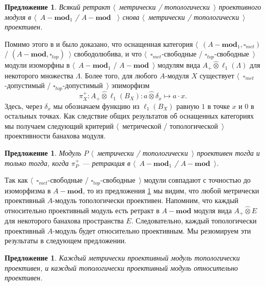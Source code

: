 \documentclass[12pt]{article}
\newcommand{\projtens}{\mathbin{\widehat{\otimes}}}
\newtheorem{proposition}[theorem]{Предложение}
\begin{document}
\begin{proposition}\label{RetrMetTopProjIsMetTopProj} Всякий ретракт $\langle$~метрически / топологически~$\rangle$ проективного модуля в $\langle$~$A-\mathbf{mod}_1$ / $A-\mathbf{mod}$ ~$\rangle$ снова $\langle$~метрически / топологически~$\rangle$ проективен.
\end{proposition}

Помимо этого в \cite{HelMetrFrQMod} и \cite{ShtTopFrClassicQuantMod} было доказано, что оснащенная категория $\langle$~$(A-\mathbf{mod}_1,\square_{met})$ / $(A-\mathbf{mod},\square_{top})$~$\rangle$ свободолюбива, и что $\langle$~$\square_{met}$-свободные / $\square_{top}$-свободные~$\rangle$ модули изоморфны в $\langle$~$A-\mathbf{mod}_1$ / $A-\mathbf{mod}$~$\rangle$ модулям вида $A_+\projtens \ell_1(\Lambda)$ для некоторого множества $\Lambda$. Более того, для любого $A$-модуля $X$ существует $\langle$~$\square_{met}$-допустимый / $\square_{top}$-допустимый~$\rangle$ эпиморфизм
$$
\pi_X^+:A_+\projtens \ell_1(B_X):a\projtens \delta_x\mapsto a\cdot x.
$$
Здесь, через $\delta_x$ мы обозначаем функцию из $\ell_1(B_X)$ равную $1$ в точке $x$ и $0$ в остальных точках. Как следствие общих результатов об оснащенных категориях мы получаем следующий критерий  $\langle$~метрической / топологической~$\rangle$ проективности банахова модуля.

\begin{proposition}\label{MetTopProjModViaCanonicMorph}
Модуль $P$ $\langle$~метрически / топологически~$\rangle$ проективен тогда и только тогда, когда  $\pi_P^+$ --- ретракция в $\langle$~$A-\mathbf{mod}_1$ / $A-\mathbf{mod}$~$\rangle$.
\end{proposition}

Так как $\langle$~$\square_{met}$-свободные / $\square_{top}$-свободные~$\rangle$ модули совпадают с точностью до изоморфизма в $A-\mathbf{mod}$, то из предложения \ref{RetrMetTopProjIsMetTopProj} мы видим, что любой метрически проективный $A$-модуль топологически проективен. Напомним, что каждый относительно проективный модуль есть ретракт в $A-\mathbf{mod}$ модуля вида $A_+\projtens E$ для некоторого банахова пространства $E$. Следовательно, каждый топологически проективный $A$-модуль будет относительно проективным. Мы резюмируем эти результаты в следующем предложении.

\begin{proposition}\label{MetProjIsTopProjAndTopProjIsRelProj} Каждый метрически проективный модуль топологически проективен, и каждый топологически проективный модуль относительно проективен.
\end{proposition}
\end{document}
